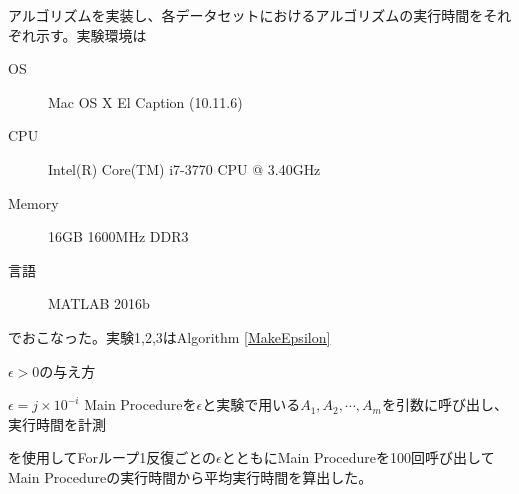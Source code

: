 アルゴリズムを実装し、各データセットにおけるアルゴリズムの実行時間をそれぞれ示す。実験環境は
\begin{description}
  \item[OS] Mac OS X El Caption (10.11.6)
  \item[CPU] Intel(R) Core(TM) i7-3770 CPU @ 3.40GHz
  \item[Memory] 16GB 1600MHz DDR3
  \item[言語] MATLAB 2016b
\end{description}
でおこなった。実験1,2,3はAlgorithm \ref{MakeEpsilon}
\begin{algorithm}
  \caption{$\epsilon > 0$の与え方}
  \label{MakeEpsilon}
  \begin{algorithmic}
        \State $\epsilon = j \times 10^{-i}$
          \State Main Procedureを$\epsilon$と実験で用いる$A_1, A_2, \cdots, A_m$を引数に呼び出し、実行時間を計測
        \EndFor
      \EndFor
    \EndFor
  \end{algorithmic}
\end{algorithm}
を使用してForループ1反復ごとの$\epsilon$とともにMain Procedureを100回呼び出してMain Procedureの実行時間から平均実行時間を算出した。

